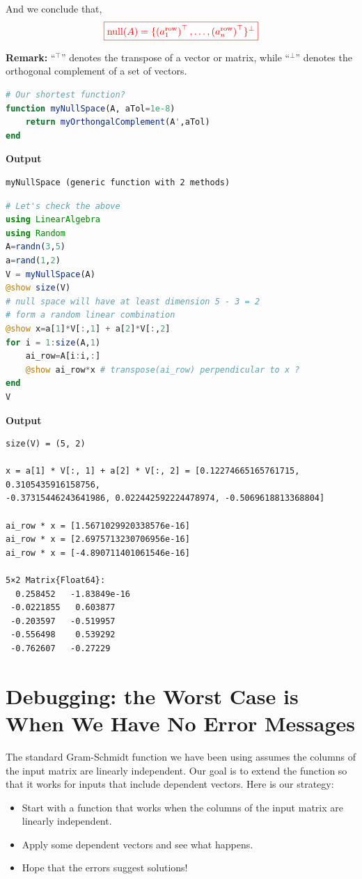 \begin{tcolorbox}[title=\textbf{Null Space of $A$ Consists of Vectors Orthogonal to the Rows of $A$}]
And we conclude that,
$$\color{red} \boxed{\mathrm{null}(A) = \{\left(a^{\rm row}_1 \right)^\top, \ldots,  \left(a^{\rm row}_n \right)^\top \}^\perp } $$

\textbf{Remark:} ``$^\top$'' denotes the transpose of a vector or matrix, while ``$ ^\perp$'' denotes the orthogonal complement of a set of vectors. 
  
\end{tcolorbox}

\begin{lstlisting}[language=Julia,style=mystyle]
# Our shortest function? 
function myNullSpace(A, aTol=1e-8)    
    return myOrthongalComplement(A',aTol)
end
\end{lstlisting}
\textbf{Output} 
\begin{verbatim}
myNullSpace (generic function with 2 methods)
\end{verbatim}

\begin{lstlisting}[language=Julia,style=mystyle]
# Let's check the above
using LinearAlgebra
using Random
A=randn(3,5)
a=rand(1,2)
V = myNullSpace(A)
@show size(V)
# null space will have at least dimension 5 - 3 = 2
# form a random linear combination
@show x=a[1]*V[:,1] + a[2]*V[:,2]
for i = 1:size(A,1)
    ai_row=A[i:i,:]
    @show ai_row*x # transpose(ai_row) perpendicular to x ?
end
V
\end{lstlisting}
\textbf{Output} 
\begin{verbatim}
size(V) = (5, 2)

x = a[1] * V[:, 1] + a[2] * V[:, 2] = [0.12274665165761715, 0.3105435916158756,
-0.37315446243641986, 0.022442592224478974, -0.5069618813368804]

ai_row * x = [1.5671029920338576e-16]
ai_row * x = [2.6975713230706956e-16]
ai_row * x = [-4.890711401061546e-16]

5×2 Matrix{Float64}:
  0.258452   -1.83849e-16
 -0.0221855   0.603877
 -0.203597   -0.519957
 -0.556498    0.539292
 -0.762607   -0.27229
\end{verbatim}

\section{Debugging: the Worst Case is When We Have No Error Messages}

The standard Gram-Schmidt function we have been using assumes the columns of the input matrix are linearly independent. Our goal is to extend the function so that it works for inputs that include dependent vectors. Here is our strategy:
\begin{itemize}
    \item Start with a function that works when the columns of the input matrix are linearly independent.
    \item Apply some dependent vectors and see what happens.
    \item Hope that the errors suggest solutions!
\end{itemize}



